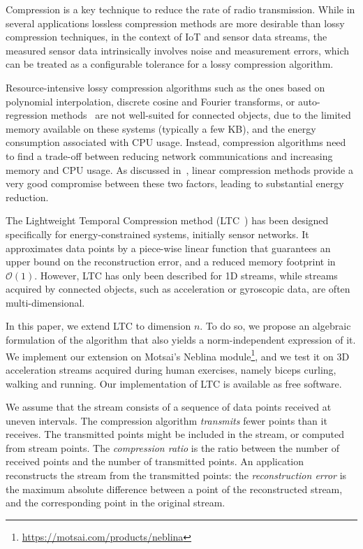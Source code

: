 \documentclass[10pt, conference, compsocconf]{IEEEtran}
\begin{document}
 Compression is a key technique to reduce the rate of radio 
 transmission.  While in several applications lossless compression 
 methods are more desirable than lossy compression techniques, in the 
 context of IoT and sensor data streams, the measured sensor data 
 intrinsically involves noise and measurement errors, which can 
 be treated as a configurable 
tolerance for a lossy compression algorithm. 

Resource-intensive lossy compression algorithms such as the ones based on 
polynomial interpolation, discrete cosine and Fourier transforms, or 
auto-regression methods~\cite{lu2010optimized} are not well-suited for 
connected objects, due to the limited memory available on 
these systems (typically a few KB), and the energy consumption 
associated with CPU usage. Instead, compression algorithms need 
to find a trade-off between reducing network communications and 
increasing memory and CPU usage. As 
discussed in~\cite{zordan2014performance}, linear compression methods 
provide a very good compromise between these two factors, leading to 
substantial energy reduction.


The Lightweight Temporal Compression method 
(LTC~\cite{schoellhammer2004lightweight}) has been designed 
specifically for energy-constrained systems, initially sensor networks. 
It approximates data points by a piece-wise linear function that 
guarantees an upper bound on the reconstruction error, and a reduced 
memory footprint in $\mathcal{O}(1)$. However, LTC has only been 
described for 1D streams, while streams acquired by connected objects, such as 
acceleration or gyroscopic data, are often multi-dimensional. 

In this paper, we extend LTC to dimension $n$. To do so, we propose an 
algebraic formulation of the algorithm that also yields a 
norm-independent expression of it. We implement our extension on 
Motsai's Neblina module\footnote{\url{ https://motsai.com/products/neblina}}, and we test it on 3D acceleration streams 
acquired during human exercises, namely biceps curling, walking and 
running. Our implementation of LTC is available as free software.

We assume that the stream consists of a sequence of data points 
received at uneven intervals. The compression algorithm 
\emph{transmits} fewer points than it receives. The transmitted points 
might be included in the stream, or computed from stream points. The 
\emph{compression ratio} is the ratio between the number of received 
points and the number of transmitted points. An application 
reconstructs the stream from the transmitted points: the 
\emph{reconstruction error} is the maximum absolute difference between 
a point of the reconstructed stream, and the corresponding 
point in the original stream.
\end{document}
